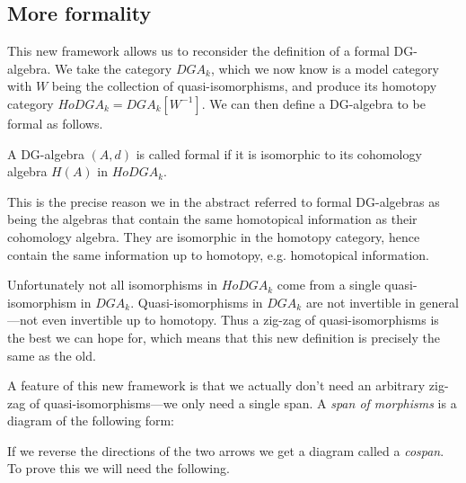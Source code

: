 \subsection{More formality}

This new framework allows us to reconsider the definition of a formal DG-algebra. We take the category $DGA_k$, which we now know is a model category with $W$ being the collection of quasi-isomorphisms, and produce its homotopy category $HoDGA_k = DGA_k[W^{-1}]$. We can then define a DG-algebra to be formal as follows. 

\begin{definition}
\label{def:formal_dga2}
A DG-algebra $(A, d)$ is called formal if it is isomorphic to its cohomology algebra $H(A)$ in $HoDGA_k$.
\end{definition}

This is the precise reason we in the abstract referred to formal DG-algebras as being the algebras that contain the same homotopical information as their cohomology algebra. They are isomorphic in the homotopy category, hence contain the same information up to homotopy, e.g. homotopical information. 

Unfortunately not all isomorphisms in $HoDGA_k$ come from a single quasi-isomorphism in $DGA_k$. Quasi-isomorphisms in $DGA_k$ are not invertible in general---not even invertible up to homotopy. Thus a zig-zag of quasi-isomorphisms is the best we can hope for, which means that this new definition is precisely the same as the old. 

A feature of this new framework is that we actually don't need an arbitrary zig-zag of quasi-isomorphisms---we only need a single span. A \emph{span of morphisms} is a diagram of the following form:

\begin{center}
\end{center}

If we reverse the directions of the two arrows we get a diagram called a \emph{cospan}. To prove this we will need the following. 

